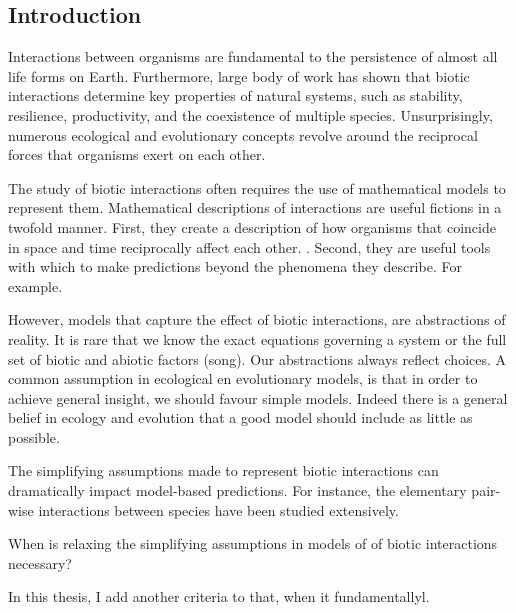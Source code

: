 \begin{refsection}
\chapter{Introduction} %
\label{Intro}

Interactions between organisms are fundamental to the persistence of almost all life forms on Earth. Furthermore, large body of work has shown that biotic interactions determine key properties of natural systems, such as stability, resilience, productivity, and the coexistence of multiple species. Unsurprisingly, numerous ecological and evolutionary concepts revolve around the reciprocal forces that organisms exert on each other.

The study of biotic interactions often requires the use of mathematical models to represent them. Mathematical descriptions of interactions are useful fictions in a twofold manner. First, they create a description of how organisms that coincide in space and time reciprocally affect each other. . Second, they are useful tools with which to make predictions beyond the phenomena they describe. For example.

However, models that capture the effect of biotic interactions, are abstractions of reality. It is rare that we know the exact equations governing a system or the full set of biotic and abiotic factors (song). Our abstractions always reflect choices.  A common assumption in ecological en evolutionary models, is that in order to achieve general insight, we should favour simple models. Indeed there is a general belief in ecology and evolution that a good model should include as little as possible.


The simplifying assumptions made to represent biotic interactions can dramatically impact model-based predictions. For instance, the elementary pair-wise interactions between species have been studied extensively.

When is relaxing the simplifying assumptions in models of  of biotic interactions necessary?


In this thesis, I add another criteria to that, when it fundamentallyl.



\end{refsection}
